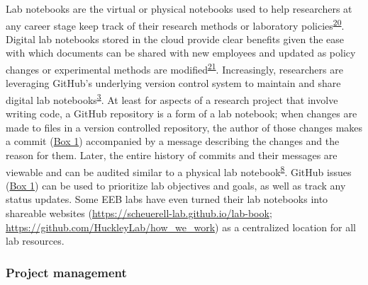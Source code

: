 Lab notebooks are the virtual or physical notebooks used to help researchers at any career stage keep track of their research methods or laboratory policies\textsuperscript{\protect\hyperlink{ref-wwHxTOtm}{20}}.
Digital lab notebooks stored in the cloud provide clear benefits given the ease with which documents can be shared with new employees and updated as policy changes or experimental methods are modified\textsuperscript{\protect\hyperlink{ref-10V7x4H4l}{21}}.
Increasingly, researchers are leveraging GitHub's underlying version control system to maintain and share digital lab notebooks\textsuperscript{\protect\hyperlink{ref-10ghgV3S8}{3}}.
At least for aspects of a research project that involve writing code, a GitHub repository is a form of a lab notebook; when changes are made to files in a version controlled repository, the author of those changes makes a commit (\protect\hyperlink{definitions}{Box 1}) accompanied by a message describing the changes and the reason for them. Later, the entire history of commits and their messages are viewable and can be audited similar to a physical lab notebook\textsuperscript{\protect\hyperlink{ref-4ny1onB0}{8}}.
GitHub issues (\protect\hyperlink{definitions}{Box 1}) can be used to prioritize lab objectives and goals, as well as track any status updates.
Some EEB labs have even turned their lab notebooks into shareable websites (\url{https://scheuerell-lab.github.io/lab-book}; \url{https://github.com/HuckleyLab/how_we_work}) as a centralized location for all lab resources.

\hypertarget{project-management}{%
\subsubsection{Project management}\label{project-management}}

